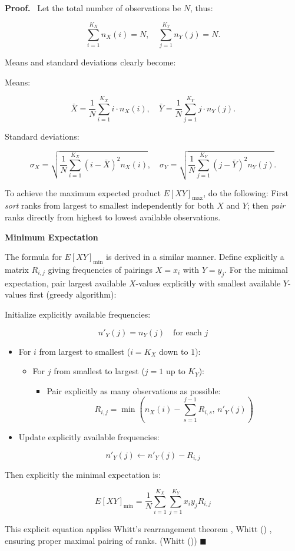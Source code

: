 \documentclass[
  12pt,
]{article}
\providecommand{\tightlist}{%
  \setlength{\itemsep}{0pt}\setlength{\parskip}{0pt}}\usepackage{longtable,booktabs,array}
\theoremstyle{plain}
\theoremstyle{definition}
\renewenvironment{proof}
   {\par\noindent\textbf{Proof.}\ }
   {\hfill$\blacksquare$\par}
\theoremstyle{remark}
\begin{document}
\begin{proof}
Let the total number of observations be \(N\), thus:

\[\sum_{i=1}^{K_X} n_{X}(i) = N,\quad \sum_{j=1}^{K_Y} n_{Y}(j) = N.\]

Means and standard deviations clearly become:

Means:

\[
\bar{X} = \frac{1}{N}\sum_{i=1}^{K_X} i \cdot n_X(i),\quad  
    \bar{Y} = \frac{1}{N}\sum_{j=1}^{K_Y} j \cdot n_Y(j).
\]

Standard deviations:

\[
\sigma_X = \sqrt{\frac{1}{N}\sum_{i=1}^{K_X} (i - \bar{X})^2 n_X(i)},\quad  
    \sigma_Y = \sqrt{\frac{1}{N}\sum_{j=1}^{K_Y} (j - \bar{Y})^2 n_Y(j)}.
\]

To achieve the maximum expected product \(E[XY]_{\text{max}}\), do the
following: First \emph{sort} ranks from largest to smallest
independently for both \(X\) and \(Y\); then \emph{pair} ranks directly
from highest to lowest available observations.

\textbf{Minimum Expectation}

The formula for \(E[XY]_{\text{min}}\) is derived in a similar manner.
Define explicitly a matrix \(R_{i,j}\) giving frequencies of pairings
\(X=x_i\) with \(Y=y_j\). For the minimal expectation, pair largest
available \(X\)-values explicitly with smallest available \(Y\)-values
first (greedy algorithm):

Initialize explicitly available frequencies:

\[n'_Y(j)=n_Y(j)\quad\text{for each }j\]

\begin{itemize}
\item
  For \(i\) from largest to smallest (\(i=K_X\) down to \(1\)):

  \begin{itemize}
  \tightlist
  \item
    For \(j\) from smallest to largest (\(j=1\) up to \(K_Y\)):

    \begin{itemize}
    \tightlist
    \item
      Pair explicitly as many observations as possible:
      \[R_{i,j}=\min\left(n_X(i)-\sum_{s=1}^{j-1}R_{i,s},\, n'_Y(j)\right)\]
    \end{itemize}
  \end{itemize}
\item
  Update explicitly available frequencies:
\end{itemize}

\[n'_Y(j)\leftarrow n'_Y(j)-R_{i,j}\]

Then explicitly the minimal expectation is:

\[E[XY]_{\text{min}}=\frac{1}{N}\sum_{i=1}^{K_X}\sum_{j=1}^{K_Y} x_i y_j R_{i,j}\]

This explicit equation applies Whitt's rearrangement theorem , Whitt
() , ensuring proper maximal
pairing of ranks. (Whitt ())
\end{proof}
\end{document}
